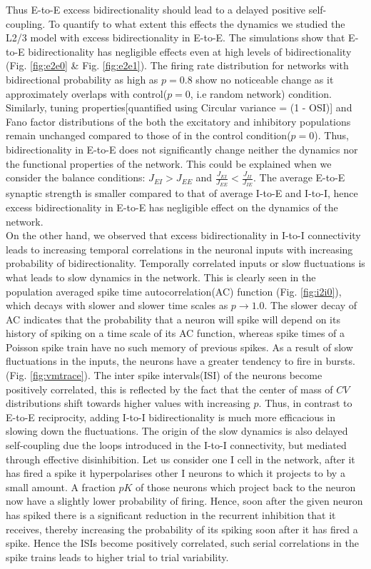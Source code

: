 Thus E-to-E excess bidirectionality should lead to a delayed positive self-coupling. To quantify to what extent this effects the dynamics we studied the L2/3 model with excess bidirectionality in E-to-E. The simulations show that E-to-E bidirectionality has negligible effects even at high levels of bidirectionality (Fig. \ref{fig:e2e0} \& Fig. \ref{fig:e2e1}). The firing rate distribution for networks with bidirectional probability as high as $p = 0.8$ show no noticeable change as it approximately overlaps with control($p = 0$, i.e random network) condition. Similarly, tuning properties[quantified using Circular variance = (1 - OSI)] and Fano factor distributions of the both the excitatory and inhibitory populations remain unchanged compared to those of in the control condition($p=0$). Thus, bidirectionality in E-to-E does not significantly change neither the dynamics nor the functional properties of the network. This could be explained when we consider the balance conditions: $J_{EI} > J_{EE}$ and $\frac{J_{EI}}{J_{EE}} < \frac{J_{II}}{J_{IE}}$. The average E-to-E synaptic strength is smaller compared to that of average I-to-E  and I-to-I, hence excess bidirectionality in E-to-E has negligible effect on the dynamics of the network. \\
On the other hand, we observed that excess bidirectionality in I-to-I connectivity leads to increasing temporal correlations in the neuronal inputs with increasing probability of bidirectionality. Temporally correlated inputs or slow fluctuations is what leads to slow dynamics in the network. This is clearly seen in the population averaged spike time autocorrelation(AC) function (Fig. \ref{fig:i2i0}), which decays with slower and slower time scales as $p \rightarrow 1.0$. The slower decay of AC indicates that the probability that a neuron will spike will depend on its history of spiking on a time scale of its AC function, whereas spike times of a Poisson spike train have no such memory of previous spikes. As a result of slow fluctuations in the inputs, the neurons have a greater tendency to fire in bursts.(Fig. \ref{fig:vmtrace}). The inter spike intervals(ISI) of the neurons become positively correlated, this is reflected by the fact that the center of mass of $CV$ distributions shift towards higher values with increasing $p$. Thus, in contrast to E-to-E reciprocity, adding I-to-I bidirectionality is much more efficacious in slowing down the fluctuations. The origin of the slow dynamics is also delayed self-coupling due the loops introduced in the I-to-I connectivity, but mediated through effective disinhibition. Let us consider one I cell in the network, after it has fired a spike it hyperpolarises other I neurons to which it projects to by a small amount. A fraction $pK$ of those neurons which project back to the neuron now have a slightly lower probability of firing. Hence, soon after the given neuron has spiked there is a significant reduction in the recurrent inhibition that it receives, thereby increasing the probability of its spiking soon after it has fired a spike. Hence the ISIs become positively correlated, such serial correlations in the spike trains leads to higher trial to trial variability.\\ 
